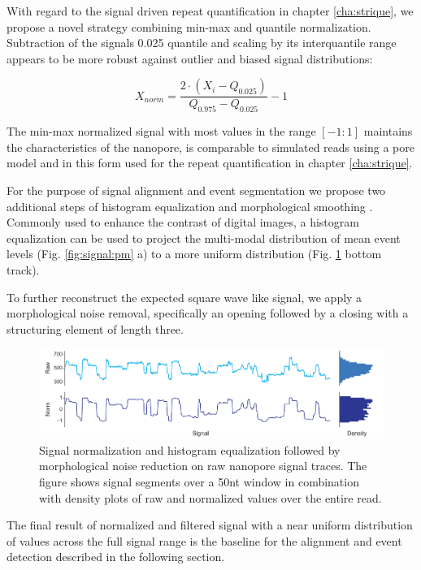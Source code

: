 With regard to the signal driven repeat quantification in chapter \ref{cha:strique}, we propose a novel strategy combining min-max and quantile normalization. Subtraction of the signals 0.025 quantile and scaling by its interquantile range appears to be more robust against outlier and biased signal distributions:

\begin{equation}
	X_{norm} = \frac{2 \cdot (X_{i} - Q_{0.025})}{Q_{0.975} - Q_{0.025}} - 1
\end{equation}

The min-max normalized signal with most values in the range $ [-1:1] $ maintains the characteristics of the nanopore, is comparable to simulated reads using a pore model and in this form used for the repeat quantification in chapter \ref{cha:strique}.

For the purpose of signal alignment and event segmentation we propose two additional steps of  histogram equalization and morphological smoothing \cite{Gonzalez2006}. Commonly used to enhance the contrast of digital images, a histogram equalization can be used to project the multi-modal distribution of mean event levels (Fig. \ref{fig:signal:pm} a) to a more uniform distribution (Fig. \ref{fig:signal:normalization} bottom track). 

To further reconstruct the expected square wave like signal, we apply a morphological noise removal, specifically an opening followed by a closing with a structuring element of length three.

\begin{figure}[h]
	\centering
	\includegraphics[width=1.0\textwidth]{figures/signal/normalization.pdf}
	\captionsetup{format=plain}
	\caption[Signal normalization and histogram equalization]{Signal normalization and histogram equalization followed by morphological noise reduction on raw nanopore signal traces. The figure shows signal segments over a 50nt window in combination with density plots of raw and normalized values over the entire read.}
	\label{fig:signal:normalization}
\end{figure}

The final result of normalized and filtered signal with a near uniform distribution of values across the full signal range is the baseline for the alignment and event detection described in the following section.




